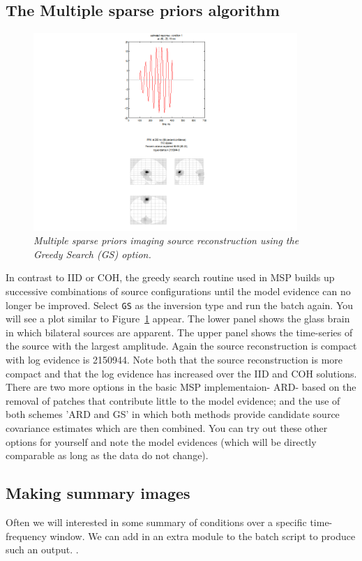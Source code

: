 \subsection{The Multiple sparse priors algorithm}

\begin{figure}
\begin{center}
\includegraphics[width=100mm]{meg_sloc/slide6}
\caption{\em Multiple sparse priors imaging source reconstruction using the Greedy Search (GS) option.\label{meg_sloc:fig:6}}
\end{center}
\end{figure}

In contrast to IID or COH, the greedy search routine used in MSP builds up successive combinations of source configurations until the model evidence can no longer be improved. 
Select \texttt{GS} as the inversion type and run the batch again. You will see a plot similar to Figure~\ref{meg_sloc:fig:6} appear. The lower panel shows the glass brain in which bilateral sources are apparent. The upper panel shows the time-series of the source with the largest amplitude.  Again the source reconstruction is compact with log evidence is 2150944. Note both that the source reconstruction is more compact and that the log evidence has increased over the IID and COH solutions.
There are two more options in the basic MSP implementaion- ARD- based on the removal of patches that contribute little to the model evidence; and the use of both schemes 'ARD and GS' in which both methods provide candidate source covariance estimates which are then combined.  You can try out these other options for yourself and note the model evidences (which will be directly comparable as long as the data do not change).

\subsection{Making summary images}
Often we will interested in some summary of conditions over a specific time-frequency window. We can add in an extra module to the batch script to produce such an output. .

